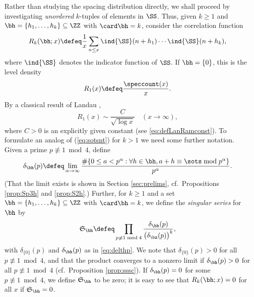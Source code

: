 \documentclass[12pt, reqno, twoside, letterpaper]{amsart}
\begin{document}
Rather than studying the spacing distribution directly, we shall
proceed by investigating {\em unordered} $k$-tuples of elements in 
$\SS$.
%
Thus, given $k \ge 1$ and $\bh = \{h_1,\ldots,h_k\} \subseteq \ZZ$ 
with $\card \bh = k$, consider the correlation function
\begin{equation}
 \label{eq:defklevcor}
 R_k(\bh;x)
  \defeq 
   \frac{1}{x}
    \sum_{n \le x}
     \ind{\SS}(n + h_1)
      \cdots 
       \ind{\SS}(n + h_k),
\end{equation}
where $\ind{\SS}$ denotes the indicator function of $\SS$.
%
If $\bh = \{0\}$, this is the level density 
\begin{equation}
 \label{eq:deflevden}
 R_1(x) 
  \defeq 
   \frac{\speccount(x)}{x}.
\end{equation}
%
By a classical result of Landau \cite{LAN:08},
\begin{equation}
 \label{eq:sotsnt}
   R_1(x) 
    \sim 
     \frac{C}{\sqrt{\log x}}
      \quad 
    (x \to \infty),
\end{equation}
where $C > 0$ is an explicitly given constant (see 
\eqref{eq:defLanRamconst}).
%
%
To formulate an analog of (\ref{eq:sotsnt}) for $k > 1$ we need 
some further notation.  
%
Given a prime $p \not \equiv 1 \bmod 4$, define%
\begin{equation}
 \label{eq:delthp}
  \delta_{\bh}(p)
   \defeq 
    \lim_{\alpha \to \infty}
     \frac{
      \#\{0 \le a < p^{\alpha} : 
             \forall h \in \bh, 
              a + h \equiv \sots \bmod p^{\alpha}\}
          }
          {p^{\alpha}}.
\end{equation}
%
(That the limit exists is shown in Section \ref{sec:prelims}, cf.\  
Propositions \ref{prop:Sp3h} and \ref{prop:S2h}.)
%
Further, for $k \ge 1$ and a set 
$\bh = \{h_1,\ldots,h_k\} \subseteq \ZZ$ with $\card \bh = k$, we 
define the {\em singular series} for $\bh$ by  
\begin{equation}
 \label{eq:defsssP}
  \mathfrak{S}_{\bh}
   \defeq 
    \prod_{p \not\equiv 1 \bmod 4}
     \frac{\delta_{\bh}(p)}{\big(\delta_{\bz}(p)\big)^k},
\end{equation}
with $\delta_{\{0\}}(p)$ and $\delta_{\bh}(p)$ as in
\eqref{eq:delthp}.
%
We note that $\delta_{\{0\}}(p) > 0$ for all 
$p \not\equiv 1 \bmod 4$, and that the  product converges to a 
nonzero limit if $\delta_{\bh}(p) > 0$ for all 
$p \not \equiv 1 \bmod 4$ (cf.\ Proposition \ref{prop:sssc}).
%
If $\delta_{\bh}(p) = 0$ for some $p \not\equiv 1 \bmod 4$, we 
define $\mathfrak{S}_{\bh}$ to be zero;
it is easy to see that
$R_k(\bh;x) = 0$ for all $x$ if $\mathfrak{S}_{\bh} = 0$.
\end{document}
